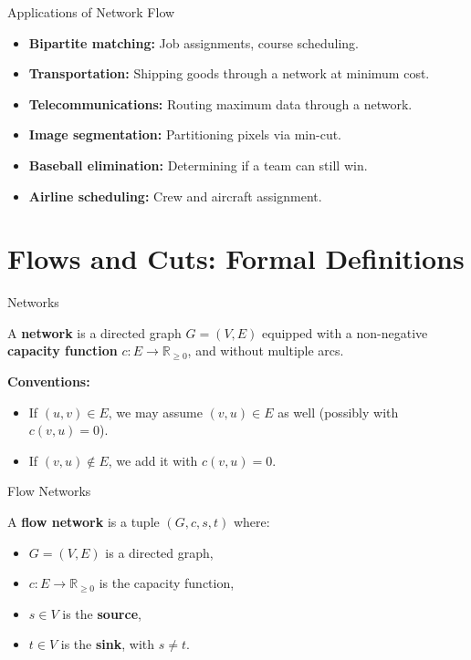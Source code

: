 \documentclass[aspectratio=169]{beamer}
\newcommand{\R}{\mathbb{R}}
\begin{document}
\begin{frame}{Applications of Network Flow}
  \begin{itemize}
    \item \textbf{Bipartite matching:} Job assignments, course scheduling.
    \item \textbf{Transportation:} Shipping goods through a network at minimum cost.
    \item \textbf{Telecommunications:} Routing maximum data through a network.
    \item \textbf{Image segmentation:} Partitioning pixels via min-cut.
    \item \textbf{Baseball elimination:} Determining if a team can still win.
    \item \textbf{Airline scheduling:} Crew and aircraft assignment.
  \end{itemize}
\end{frame}

\section{Flows and Cuts: Formal Definitions}

\begin{frame}{Networks}
  \begin{definition}
    A \textbf{network} is a directed graph $G = (V, E)$ equipped with a
    non-negative \textbf{capacity function} $c : E \to \R_{\geq 0}$, and
    without multiple arcs.
  \end{definition}

  \vspace{0.5em}
  \textbf{Conventions:}
  \begin{itemize}
    \item If $(u,v) \in E$, we may assume $(v,u) \in E$ as well (possibly with
          $c(v,u) = 0$).
    \item If $(v,u) \notin E$, we add it with $c(v,u) = 0$.
  \end{itemize}
\end{frame}

\begin{frame}{Flow Networks}
  \begin{definition}
    A \textbf{flow network} is a tuple $(G, c, s, t)$ where:
    \begin{itemize}
      \item $G = (V, E)$ is a directed graph,
      \item $c : E \to \R_{\geq 0}$ is the capacity function,
      \item $s \in V$ is the \textbf{source},
      \item $t \in V$ is the \textbf{sink}, with $s \neq t$.
    \end{itemize}
  \end{definition}
\end{frame}
\end{document}
